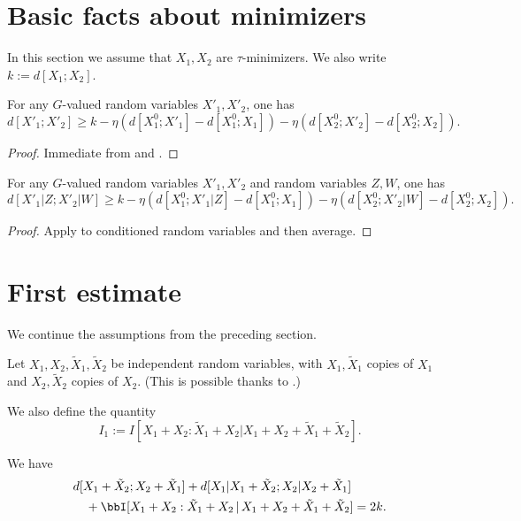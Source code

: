 \section{Basic facts about minimizers}

In this section we assume that $X_1,X_2$ are $\tau$-minimizers. We also write $k := d[X_1;X_2]$.

\begin{lemma}\label{distance-lower}
  \leanok
  For any $G$-valued random variables $X'_1,X'_2$, one has
$$ d[X'_1;X'_2] \geq k - \eta (d[X^0_1;X'_1] - d[X^0_1;X_1] ) - \eta (d[X^0_2;X'_2] - d[X^0_2;X_2] ).$$
\end{lemma}

\begin{proof}
  \leanok
  Immediate from  and .
\end{proof}

\begin{lemma}\label{cond-distance-lower}
  \leanok
  For any $G$-valued random variables $X'_1,X'_2$ and random variables $Z,W$, one has
$$ d[X'_1|Z;X'_2|W] \geq k - \eta (d[X^0_1;X'_1|Z] - d[X^0_1;X_1] ) - \eta (d[X^0_2;X'_2|W] - d[X^0_2;X_2] ).$$
\end{lemma}

\begin{proof}\leanok  Apply  to conditioned random variables and then average.
\end{proof}

\section{First estimate}

We continue the assumptions from the preceding section.

Let $X_1, X_2, \tilde X_1, \tilde X_2$ be independent random variables, with $X_1,\tilde X_1$ copies of $X_1$ and $X_2,\tilde X_2$ copies of $X_2$.  (This is possible thanks to .)

We also define the quantity
$$ I_1 :=  I [X_1+X_2 : \tilde X_1 + X_2 | X_1+X_2+\tilde X_1+\tilde X_2].$$

\begin{lemma}\label{first-fibre}
  \leanok
  We have
  \begin{align*}
    &   d[X_1+\tilde X_2;X_2+\tilde X_1] + d[X_1|X_1+\tilde X_2; X_2|X_2+\tilde X_1] \\
    &\quad + \bbI[X_1+ X_2 : \tilde X_1 + X_2 \,|\, X_1 + X_2 + \tilde X_1 + \tilde X_2] = 2k.
  \end{align*}
\end{lemma}

